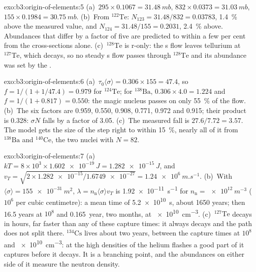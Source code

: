 \begin{solution}{exo:b3:origin-of-elements:5}
(a)~$295\times0.1067 = \qty{31.48}{mb}$, $832\times0.0373 =
\qty{31.03}{mb}$, $155\times0.1984 = \qty{30.75}{mb}$. (b)~From
$^{122}\mathrm{Te}$: $N_{123} = 31.48/832 = \num{0.03783}$, \qty{1.4}{\percent}
above the measured value, and $N_{124} = 31.48/155 = \num{0.2031}$,
\qty{2.4}{\percent} above. Abundances that differ by a factor of five are
predicted to within a few per cent from the cross-sections alone.
(c)~$^{128}\mathrm{Te}$ is r-only: the s flow leaves tellurium at
$^{127}\mathrm{Te}$, which decays, so no steady s flow passes through
$^{128}\mathrm{Te}$ and its abundance was set by the .
\end{solution}

\begin{solution}{exo:b3:origin-of-elements:6}
(a)~$\tau_0\langle\sigma\rangle = 0.306\times155 = 47.4$, so
$f = 1/(1 + 1/47.4) = \num{0.979}$ for $^{124}\mathrm{Te}$; for
$^{138}\mathrm{Ba}$, $0.306\times4.0 = 1.224$ and $f = 1/(1 + 0.817) =
\num{0.550}$: the magic nucleus passes on only \qty{55}{\percent} of the
flow. (b)~The six factors are \num{0.959}, \num{0.550}, \num{0.908},
\num{0.771}, \num{0.972} and \num{0.915}; their product is \num{0.328}:
$\sigma N$ falls by a factor of \num{3.05}. (c)~The measured fall is
$27.6/7.72 = 3.57$. The model gets the size of the step right to within
\qty{15}{\percent}, nearly all of it from $^{138}\mathrm{Ba}$ and
$^{140}\mathrm{Ce}$, the two nuclei with $N = 82$.
\end{solution}

\begin{solution}{exo:b3:origin-of-elements:7}
(a)~$kT = 8\times10^3\times\qty{1.602e-19}{J} = \qty{1.282e-15}{J}$, and
$v_T = \sqrt{2\times\num{1.282e-15}/\num{1.6749e-27}} =
\qty{1.24e6}{m.s^{-1}}$. (b)~With $\langle\sigma\rangle =
\qty{155e-31}{m^2}$, $\lambda = n_\mathrm{n}\langle\sigma\rangle v_T$
is \qty{1.92e-11}{s^{-1}} for $n_\mathrm{n} = \qty{e12}{m^{-3}}$
($10^6$ per cubic centimetre): a mean time of \qty{5.2e10}{s}, about
\num{1650} years; then \num{16.5} years at $10^8$ and \num{0.165}~year,
two months, at \qty{e10}{cm^{-3}}. (c)~$^{127}\mathrm{Te}$ decays in
hours, far faster than any of these capture times: it always decays and
the path does not split there. $^{134}\mathrm{Cs}$ lives about two
years, between the capture times at $10^8$ and \qty{e10}{cm^{-3}}: at
the high densities of the helium flashes a good part of it captures
before it decays. It is a branching point, and the abundances on either
side of it measure the neutron density.
\end{solution}

